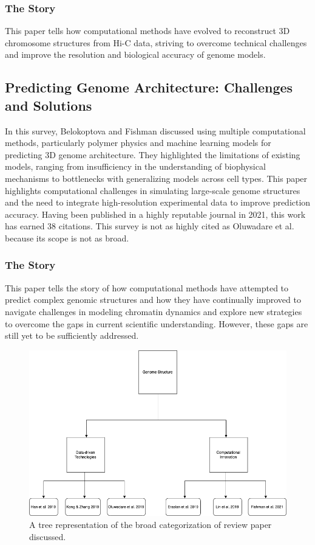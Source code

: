 \subsubsection{The Story} This paper tells how computational methods have evolved to reconstruct 3D chromosome structures from Hi-C data, striving to overcome technical challenges and improve the resolution and biological accuracy of genome models.

\subsection{Predicting Genome Architecture: Challenges and Solutions}
In this survey, Belokoptova and Fishman \cite{belokopytova2021predicting} discussed using multiple computational methods, particularly polymer physics and machine learning models for predicting 3D genome architecture. They highlighted the limitations of existing models, ranging from insufficiency in the understanding of biophysical mechanisms to bottlenecks with generalizing models across cell types. This paper highlights computational challenges in simulating large-scale genome structures and the need to integrate high-resolution experimental data to improve prediction accuracy. Having been published in a highly reputable journal in 2021, this work has earned 38 citations. This survey is not as highly cited as Oluwadare et al. \cite{oluwadare_overview_2019} because its scope is not as broad. 
\subsubsection{The Story}
This paper tells the story of how computational methods have attempted to predict complex genomic structures and how they have continually improved to navigate challenges in modeling chromatin dynamics and explore new strategies to overcome the gaps in current scientific understanding. However, these gaps are still yet to be sufficiently addressed.
\begin{figure}[h!]
    \centering
    \includegraphics[width=1\textwidth]{images/j333.png}
    \caption{A tree representation of the broad categorization of review paper discussed.}
    \label{j3categories}
\end{figure}


